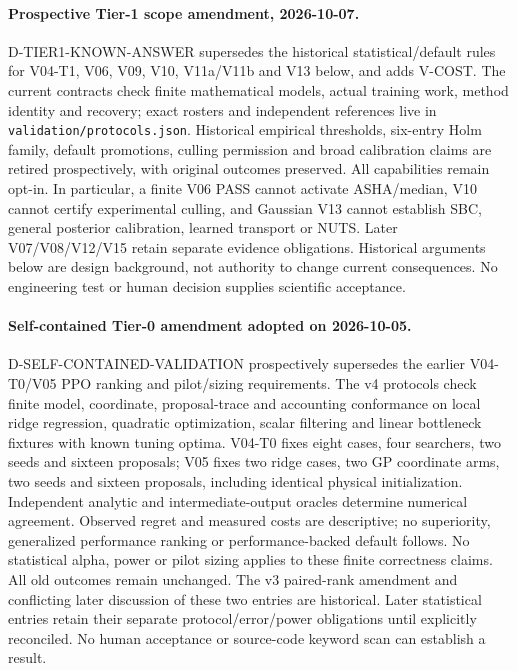 \paragraph{Prospective Tier-1 scope amendment, 2026-10-07.}
D-TIER1-KNOWN-ANSWER supersedes the historical statistical/default rules for
V04-T1, V06, V09, V10, V11a/V11b and V13 below, and adds V-COST.
The current contracts check finite mathematical models, actual training work,
method identity and recovery; exact rosters and independent references live in
\texttt{validation/protocols.json}. Historical empirical thresholds, six-entry
Holm family, default promotions, culling permission and broad calibration
claims are retired prospectively, with original outcomes preserved.
All capabilities remain opt-in. In particular, a finite V06 PASS cannot activate
ASHA/median, V10 cannot certify experimental culling, and Gaussian V13 cannot
establish SBC, general posterior calibration, learned transport or NUTS.
Later V07/V08/V12/V15 retain separate evidence obligations. Historical arguments
below are design background, not authority to change current consequences.
No engineering test or human decision supplies scientific acceptance.



\paragraph{Self-contained Tier-0 amendment adopted on 2026-10-05.}
D-SELF-CONTAINED-VALIDATION prospectively supersedes the earlier V04-T0/V05
PPO ranking and pilot/sizing requirements. The v4 protocols check finite
model, coordinate, proposal-trace and accounting conformance on local
ridge regression, quadratic optimization, scalar filtering and linear
bottleneck fixtures with known tuning optima. V04-T0 fixes eight cases,
four searchers, two seeds and sixteen proposals; V05 fixes two ridge cases,
two GP coordinate arms, two seeds and sixteen proposals, including identical
physical initialization. Independent analytic and intermediate-output
oracles determine numerical agreement. Observed regret and measured costs
are descriptive; no superiority, generalized performance ranking or
performance-backed default follows. No statistical alpha, power or pilot
sizing applies to these finite correctness claims. All old outcomes remain
unchanged. The v3 paired-rank amendment and conflicting later discussion of
these two entries are historical. Later statistical entries retain their
separate protocol/error/power obligations until explicitly reconciled.
No human acceptance or source-code keyword scan can establish a result.

